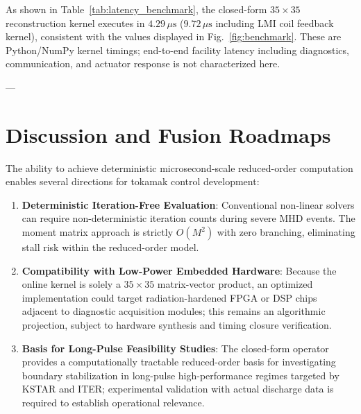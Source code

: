 \documentclass[11pt,a4paper]{article}
\begin{document}
\begin{table}[htbp]
\centering
\caption{Computational Performance of the Reduced-Order Moment Flux Kernel}
\label{tab:latency_benchmark}
\end{table}

As shown in Table~\ref{tab:latency_benchmark}, the closed-form $35 \times 35$ reconstruction kernel executes in $4.29\,\mu\mathrm{s}$ ($9.72\,\mu\mathrm{s}$ including LMI coil feedback kernel), consistent with the values displayed in Fig.~\ref{fig:benchmark}. These are Python/NumPy kernel timings; end-to-end facility latency including diagnostics, communication, and actuator response is not characterized here.

---

\section{Discussion and Fusion Roadmaps}
The ability to achieve deterministic microsecond-scale reduced-order computation enables several directions for tokamak control development:
\begin{enumerate}
    \item \textbf{Deterministic Iteration-Free Evaluation}: Conventional non-linear solvers can require non-deterministic iteration counts during severe MHD events. The moment matrix approach is strictly $O(M^2)$ with zero branching, eliminating stall risk within the reduced-order model.
    \item \textbf{Compatibility with Low-Power Embedded Hardware}: Because the online kernel is solely a $35 \times 35$ matrix-vector product, an optimized implementation could target radiation-hardened FPGA or DSP chips adjacent to diagnostic acquisition modules; this remains an algorithmic projection, subject to hardware synthesis and timing closure verification.
    \item \textbf{Basis for Long-Pulse Feasibility Studies}: The closed-form operator provides a computationally tractable reduced-order basis for investigating boundary stabilization in long-pulse high-performance regimes targeted by KSTAR and ITER; experimental validation with actual discharge data is required to establish operational relevance.
\end{enumerate}
\end{document}
